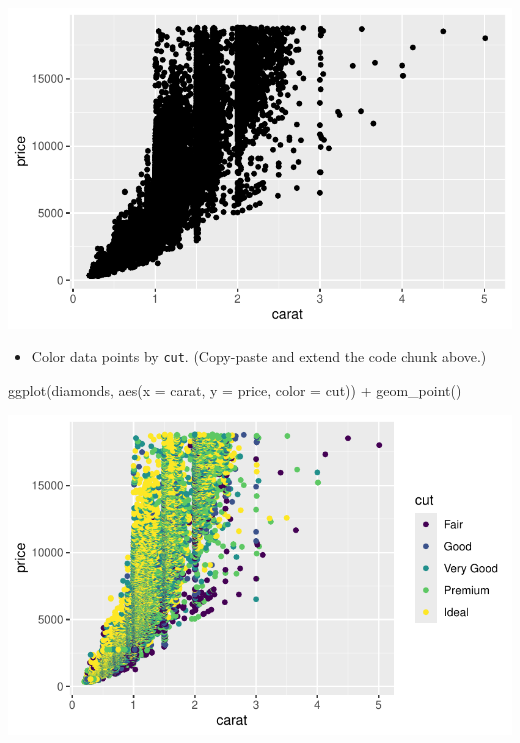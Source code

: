 \documentclass[
  letterpaper,
  DIV=11,
  numbers=noendperiod]{scrartcl}
\newenvironment{Shaded}{\begin{snugshade}}{\end{snugshade}}
\newcommand{\AttributeTok}[1]{\textcolor[rgb]{0.40,0.45,0.13}{#1}}
\newcommand{\FunctionTok}[1]{\textcolor[rgb]{0.28,0.35,0.67}{#1}}
\newcommand{\NormalTok}[1]{\textcolor[rgb]{0.00,0.23,0.31}{#1}}
\newcommand{\SpecialCharTok}[1]{\textcolor[rgb]{0.37,0.37,0.37}{#1}}
\providecommand{\tightlist}{%
  \setlength{\itemsep}{0pt}\setlength{\parskip}{0pt}}\usepackage{longtable,booktabs,array}
\begin{document}
\includegraphics{5-ggplot2_kevin_files/figure-pdf/unnamed-chunk-5-1.pdf}

\begin{itemize}
\tightlist
\item
  Color data points by \texttt{cut}. (Copy-paste and extend the code
  chunk above.)
\end{itemize}

\begin{Shaded}
\begin{Highlighting}[]
\FunctionTok{ggplot}\NormalTok{(diamonds, }\FunctionTok{aes}\NormalTok{(}\AttributeTok{x =}\NormalTok{ carat, }\AttributeTok{y =}\NormalTok{ price, }\AttributeTok{color =}\NormalTok{ cut)) }\SpecialCharTok{+}
  \FunctionTok{geom\_point}\NormalTok{()}
\end{Highlighting}
\end{Shaded}

\includegraphics{5-ggplot2_kevin_files/figure-pdf/unnamed-chunk-6-1.pdf}
\end{document}
